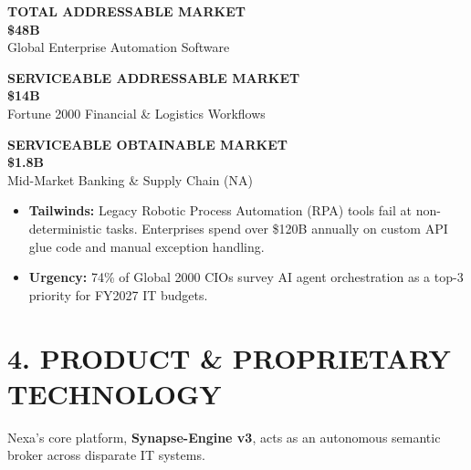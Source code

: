 \documentclass[10pt,a4paper]{article}
\begin{document}
\begin{minipage}[t]{0.31\textwidth}
  \begin{tcolorbox}[metricbox]
    {\color{subtletext}\scriptsize\bfseries TOTAL ADDRESSABLE MARKET}\\[2pt]
    {\color{primary}\Huge\bfseries \$48B}\\[2pt]
    {\color{darktext}\tiny Global Enterprise Automation Software}
  \end{tcolorbox}
\end{minipage}%
\hfill
\begin{minipage}[t]{0.31\textwidth}
  \begin{tcolorbox}[metricbox]
    {\color{subtletext}\scriptsize\bfseries SERVICEABLE ADDRESSABLE MARKET}\\[2pt]
    {\color{accent}\Huge\bfseries \$14B}\\[2pt]
    {\color{darktext}\tiny Fortune 2000 Financial \& Logistics Workflows}
  \end{tcolorbox}
\end{minipage}%
\hfill
\begin{minipage}[t]{0.31\textwidth}
  \begin{tcolorbox}[metricbox]
    {\color{subtletext}\scriptsize\bfseries SERVICEABLE OBTAINABLE MARKET}\\[2pt]
    {\color{emerald}\Huge\bfseries \$1.8B}\\[2pt]
    {\color{darktext}\tiny Mid-Market Banking \& Supply Chain (NA)}
  \end{tcolorbox}
\end{minipage}

\par\vspace{4pt}

\begin{itemize}
  \item \textbf{Tailwinds:} Legacy Robotic Process Automation (RPA) tools fail at non-deterministic tasks. Enterprises spend over \$120B annually on custom API glue code and manual exception handling.
  \item \textbf{Urgency:} 74\% of Global 2000 CIOs survey AI agent orchestration as a top-3 priority for FY2027 IT budgets.
\end{itemize}

\vspace{2pt}

\section*{4. PRODUCT \& PROPRIETARY TECHNOLOGY}
Nexa's core platform, \textbf{Synapse-Engine v3}, acts as an autonomous semantic broker across disparate IT systems.
\end{document}
